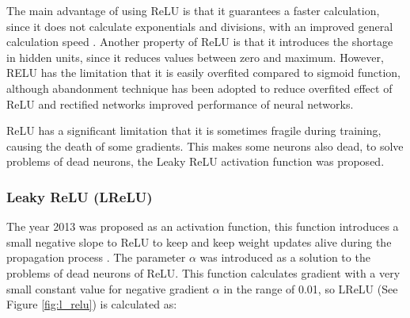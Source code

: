 \vspace{5mm} %

The main advantage of using ReLU is that it guarantees a faster calculation, since it does not calculate exponentials and divisions, with an improved general calculation speed \cite{Reference45}. Another property of ReLU is that it introduces the shortage in hidden units, since it reduces values between zero and maximum. However, RELU has the limitation that it is easily overfited compared to sigmoid function, although abandonment technique has been adopted to reduce overfited effect of ReLU and rectified networks improved performance of neural networks.

\vspace{5mm} %

ReLU has a significant limitation that it is sometimes fragile during training, causing the death of some gradients. This makes some neurons also dead, to solve problems of dead neurons, the Leaky ReLU activation function was proposed.

\subsubsection{Leaky ReLU (LReLU)}

The year 2013 was proposed as an activation function, this function introduces a small negative slope to ReLU to keep and keep weight updates alive during the propagation process \cite{Reference44}. The parameter $\alpha$ was introduced as a solution to the problems of dead neurons of ReLU. This function calculates gradient with a very small constant value for negative gradient $\alpha$ in the range of 0.01, so LReLU (See Figure \ref{fig:l_relu}) is calculated as:

